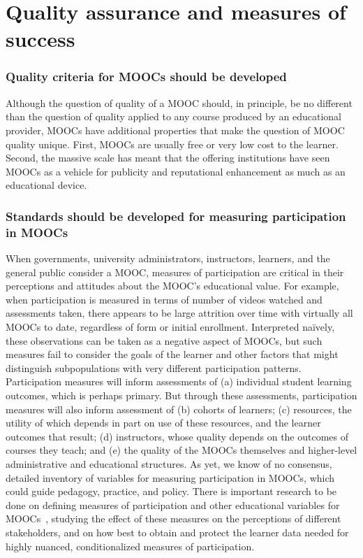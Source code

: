 \documentclass[a4paper,UKenglish]{dagman}
\begin{document}
\section{Quality assurance and measures of success}

\subsubsection*{Quality criteria for MOOCs should be developed}
Although the question of quality of a MOOC should, in principle, be no different than the question
of quality applied to any course produced by an educational provider, MOOCs have additional
properties that make the question of MOOC quality unique. First, MOOCs are usually free or very low
cost to the learner. Second, the massive scale has meant that the offering institutions have seen
MOOCs as a vehicle for publicity and reputational enhancement as much as an educational device.

\subsubsection*{Standards should be developed for measuring participation in MOOCs}

When governments, university administrators, instructors, learners, and the general public consider
a MOOC, measures of participation are critical in their perceptions and attitudes about the MOOC's
educational value. For example, when participation is measured in terms of number of videos watched
and assessments taken, there appears to be large attrition over time with virtually all MOOCs to
date, regardless of form or initial enrollment. Interpreted na\"{i}vely, these observations can be
taken as a negative aspect of MOOCs, but such measures fail to consider the goals of the learner and
other factors that might distinguish subpopulations with very different participation patterns.
Participation measures will inform assessments of (a) individual student learning outcomes, which is
perhaps primary. But through these assessments, participation measures will also inform assessment
of (b) cohorts of learners; (c) resources, the utility of which depends in part on use of these
resources, and the learner outcomes that result; (d) instructors, whose quality depends on the
outcomes of courses they teach; and (e) the quality of the MOOCs themselves and higher-level
administrative and educational structures.  As yet, we know of no consensus, detailed inventory of
variables for measuring participation in MOOCs, which could guide pedagogy, practice, and policy.
There is important research to be done on defining measures of participation and other educational
variables for MOOCs~\cite{deboer-ho-reconceptualizing}, studying the effect of these measures on the
perceptions of different stakeholders, and on how best to obtain and protect the learner data needed
for highly nuanced, conditionalized measures of participation.
\end{document}
